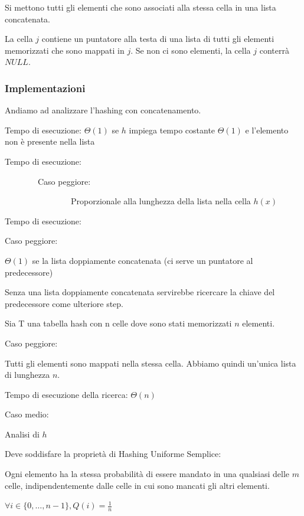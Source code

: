 \documentclass{article}
\begin{document}
{Si mettono tutti gli elementi che sono associati alla stessa cella in una lista concatenata.}

{La cella $j$ contiene un puntatore alla testa di una lista di tutti gli elementi memorizzati che sono mappati in $j$. Se non ci sono elementi, la cella $j$ conterrà $NULL$.}

\subsubsection{Implementazioni}

{Andiamo ad analizzare l'hashing con concatenamento.}



{Tempo di esecuzione: $\Theta(1)$ se $h$ impiega tempo costante $\Theta(1)$ e l'elemento non è presente nella lista}



{Tempo di esecuzione:}

{~~~~~~~~Caso peggiore:}

{~~~~~~~~~~~~~~~~Proporzionale alla lunghezza della lista nella cella $h(x)$}



{Tempo di esecuzione:}

{Caso peggiore:}

{$\Theta(1)$ se la lista doppiamente concatenata (ci serve un puntatore al predecessore)}

{Senza una lista doppiamente concatenata servirebbe ricercare la chiave del predecessore come ulteriore step.}

{Sia T una tabella hash con n celle dove sono stati memorizzati $n$ elementi. }

{Caso peggiore:}

{Tutti gli elementi sono mappati nella stessa cella. Abbiamo quindi
un'unica lista di lunghezza $n$.}

{Tempo di esecuzione della ricerca: $\Theta(n)$}

{Caso medio:}

{Analisi di $h$}

{Deve soddisfare la proprietà di }{Hashing Uniforme Semplice:}

{Ogni elemento ha la stessa probabilità di essere mandato in una qualsiasi delle $m$ celle, indipendentemente dalle celle in cui sono mancati gli altri elementi.}

$\forall i \in \{0,\ldots,n-1\}, Q(i) = \frac{1}{n}$
\end{document}
